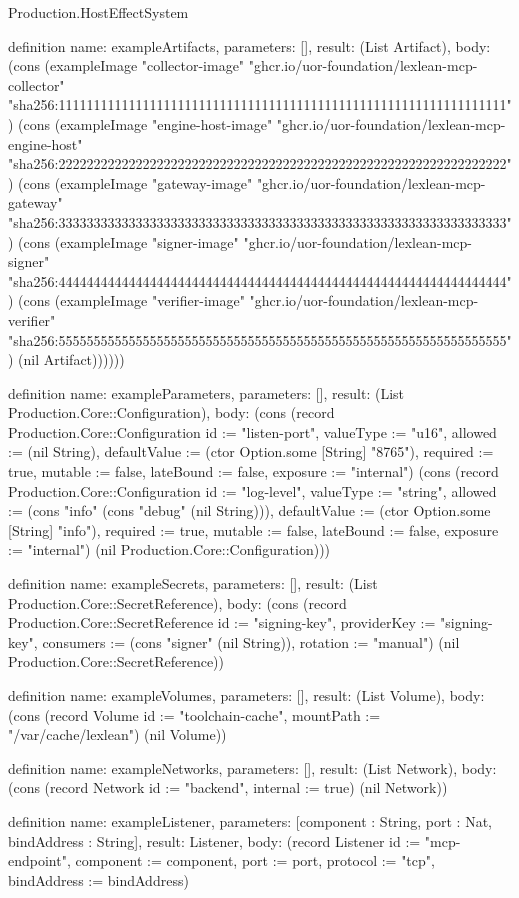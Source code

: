 \begin{lexlean}{Production.HostEffectSystem}
\begin{semanticmodule}
definition{
  name: exampleArtifacts,
  parameters: [],
  result: (List Artifact),
  body: (cons (exampleImage "collector-image" "ghcr.io/uor-foundation/lexlean-mcp-collector" "sha256:1111111111111111111111111111111111111111111111111111111111111111") (cons (exampleImage "engine-host-image" "ghcr.io/uor-foundation/lexlean-mcp-engine-host" "sha256:2222222222222222222222222222222222222222222222222222222222222222") (cons (exampleImage "gateway-image" "ghcr.io/uor-foundation/lexlean-mcp-gateway" "sha256:3333333333333333333333333333333333333333333333333333333333333333") (cons (exampleImage "signer-image" "ghcr.io/uor-foundation/lexlean-mcp-signer" "sha256:4444444444444444444444444444444444444444444444444444444444444444") (cons (exampleImage "verifier-image" "ghcr.io/uor-foundation/lexlean-mcp-verifier" "sha256:5555555555555555555555555555555555555555555555555555555555555555") (nil Artifact))))))
}

definition{
  name: exampleParameters,
  parameters: [],
  result: (List Production.Core::Configuration),
  body: (cons (record Production.Core::Configuration {id := "listen-port", valueType := "u16", allowed := (nil String), defaultValue := (ctor Option.some [String] "8765"), required := true, mutable := false, lateBound := false, exposure := "internal"}) (cons (record Production.Core::Configuration {id := "log-level", valueType := "string", allowed := (cons "info" (cons "debug" (nil String))), defaultValue := (ctor Option.some [String] "info"), required := true, mutable := false, lateBound := false, exposure := "internal"}) (nil Production.Core::Configuration)))
}

definition{
  name: exampleSecrets,
  parameters: [],
  result: (List Production.Core::SecretReference),
  body: (cons (record Production.Core::SecretReference {id := "signing-key", providerKey := "signing-key", consumers := (cons "signer" (nil String)), rotation := "manual"}) (nil Production.Core::SecretReference))
}

definition{
  name: exampleVolumes,
  parameters: [],
  result: (List Volume),
  body: (cons (record Volume {id := "toolchain-cache", mountPath := "/var/cache/lexlean"}) (nil Volume))
}

definition{
  name: exampleNetworks,
  parameters: [],
  result: (List Network),
  body: (cons (record Network {id := "backend", internal := true}) (nil Network))
}

definition{
  name: exampleListener,
  parameters: [component : String, port : Nat, bindAddress : String],
  result: Listener,
  body: (record Listener {id := "mcp-endpoint", component := component, port := port, protocol := "tcp", bindAddress := bindAddress})
}


\end{semanticmodule}
\end{lexlean}
